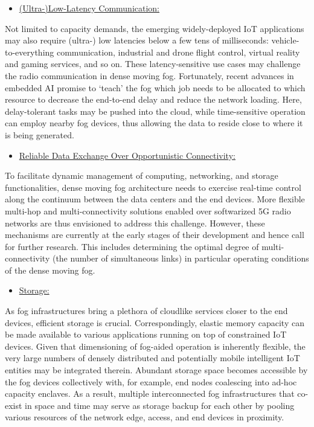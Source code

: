 \documentclass[11pt]{article}
\begin{document}
\begin{itemize}
\item {\large \uline{(Ultra-)Low-Latency Communication:}}
\end{itemize}

Not limited to capacity demands, the emerging widely-deployed IoT applications may also require (ultra-) low latencies below a few tens of milliseconds: vehicle-to-everything communication, industrial and drone flight control, virtual reality and gaming services, and so on. These latency-sensitive use cases may challenge the radio communication in dense moving fog. Fortunately, recent advances in embedded AI promise to ‘teach’ the fog which job needs to be allocated to which resource to decrease the end-to-end delay and reduce the network loading. Here, delay-tolerant tasks may be pushed into the cloud, while time-sensitive operation can employ nearby fog devices, thus allowing the data to reside close to where it is being generated.

\begin{itemize}
\item {\large \uline{Reliable Data Exchange Over Opportunistic Connectivity:}}
\end{itemize}

To facilitate dynamic management of computing, networking, and storage functionalities, dense moving fog architecture needs to exercise real-time control along the continuum between the data centers and the end devices. More flexible multi-hop and multi-connectivity solutions enabled over softwarized 5G radio networks are thus envisioned to address this challenge. However, these mechanisms are currently at the early stages of their development and hence call for further research. This includes determining the optimal degree of multi-connectivity (the number of simultaneous links) in particular operating conditions of the dense moving fog.

\begin{itemize}
\item {\large \uline{Storage:}}
\end{itemize}

As fog infrastructures bring a plethora of cloudlike services closer to the end devices, efficient storage is crucial. Correspondingly, elastic memory capacity can be made available to various applications running on top of constrained IoT devices. Given that dimensioning of fog-aided operation is inherently flexible, the very large numbers of densely distributed and potentially mobile intelligent IoT entities may be integrated therein. Abundant storage space becomes accessible by the fog devices collectively with, for example, end nodes coalescing into ad-hoc capacity enclaves. As a result, multiple interconnected fog infrastructures that co-exist in space and time may serve as storage backup for each other by pooling various resources of the network edge, access, and end devices in proximity.
\end{document}

